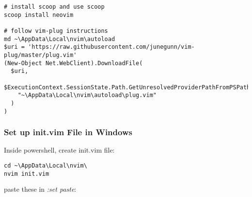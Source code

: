 \documentclass[]{article}
\begin{document}
\begin{verbatim}
# install scoop and use scoop
scoop install neovim

# follow vim-plug instructions
md ~\AppData\Local\nvim\autoload
$uri = 'https://raw.githubusercontent.com/junegunn/vim-plug/master/plug.vim'
(New-Object Net.WebClient).DownloadFile(
  $uri,
  $ExecutionContext.SessionState.Path.GetUnresolvedProviderPathFromPSPath(
    "~\AppData\Local\nvim\autoload\plug.vim"
  )
)
\end{verbatim}

\hypertarget{set-up-init.vim-file-in-windows}{%
\subsubsection{Set up init.vim File in
Windows}\label{set-up-init.vim-file-in-windows}}

Inside powershell, create init.vim file:

\begin{verbatim}
cd ~\AppData\Local\nvim\
nvim init.vim
\end{verbatim}

paste these in \emph{:set paste}:
\end{document}
